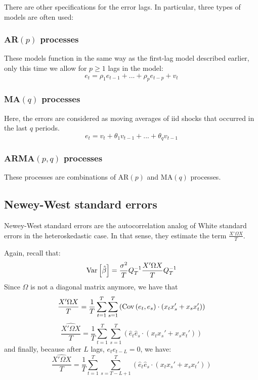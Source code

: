 There are other specifications for the error lags. In particular, three types of models are often used:

\subsubsection{AR$(p)$ processes}

These models function in the same way as the first-lag model described earlier, only this time we allow for $p\geq 1$ lags in the model: $$e_t = \rho_1 e_{t-1} + ... + \rho_p e_{t-p} + v_t $$

\subsubsection{MA$(q)$ processes}

Here, the errors are considered as moving averages of iid shocks that occurred in the last $q$ periods. $$e_t = v_t + \theta_1 v_{t-1} + ... + \theta_q v_{t-1} $$

\subsubsection{ARMA$(p,q)$ processes}

These processes are combinations of AR$(p)$ and MA$(q)$ processes.

\subsection{Newey-West standard errors}

Newey-West standard errors are the autocorrelation analog of White standard errors in the heteroskedastic case. In that sense, they estimate the term $\frac{X'\Omega X}{T}$.

Again, recall that: $$\operatorname{Var}\left[\hat \beta\right] = \frac{\sigma^2}{T}Q_T^{-1} \frac{X'\Omega X}{T} Q_T^{-1} $$ Since $\Omega$ is not a diagonal matrix anymore, we have that $$\frac{X'\Omega X}{T} = \frac{1}{T}\sum_{t=1}^{T}\sum_{s=1}^{T}\left( \operatorname{Cov}\left(e_t,e_s\right)\cdot(x_tx_s' + x_sx_t') \right) $$ $$\widehat{\frac{X'\Omega X}{T}} = \frac{1}{T}\sum_{t=1}^{T}\sum_{s=1}^{T}\left(\hat e_t\hat e_s\cdot(x_tx_s' + x_sx_t') \right) $$ and finally, because after $L$ lags, $e_te_{t-L} = 0$, we have: $$\widehat{\frac{X'\Omega X}{T}} = \frac{1}{T}\sum_{t=1}^{T}\sum_{s=T-L+1}^{T}\left(\hat e_t\hat e_s\cdot(x_tx_s' + x_sx_t') \right) $$